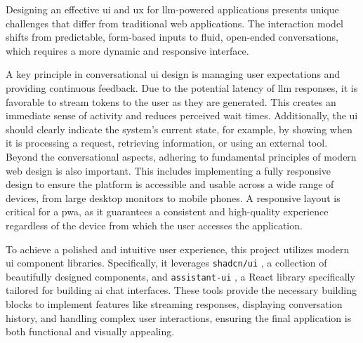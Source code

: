 Designing an effective \ac{ui} and \ac{ux} for \ac{llm}-powered applications presents unique challenges that differ from traditional web applications. The interaction model shifts from predictable, form-based inputs to fluid, open-ended conversations, which requires a more dynamic and responsive interface.

A key principle in conversational \acs{ui} design is managing user expectations and providing continuous feedback. Due to the potential latency of \ac{llm} responses, it is favorable to stream tokens to the user as they are generated. This creates an immediate sense of activity and reduces perceived wait times. Additionally, the \acs{ui} should clearly indicate the system's current state, for example, by showing when it is processing a request, retrieving information, or using an external tool. Beyond the conversational aspects, adhering to fundamental principles of modern web design is also important. This includes implementing a fully responsive design to ensure the platform is accessible and usable across a wide range of devices, from large desktop monitors to mobile phones. A responsive layout is critical for a \ac{pwa}, as it guarantees a consistent and high-quality experience regardless of the device from which the user accesses the application.

To achieve a polished and intuitive user experience, this project utilizes modern \acs{ui} component libraries. Specifically, it leverages \texttt{shadcn/ui} \cite{SHADCN-UI}, a collection of beautifully designed components, and \texttt{assistant-ui} \cite{ASSISTANT-UI}, a React library specifically tailored for building \acs{ai} chat interfaces. These tools provide the necessary building blocks to implement features like streaming responses, displaying conversation history, and handling complex user interactions, ensuring the final application is both functional and visually appealing.